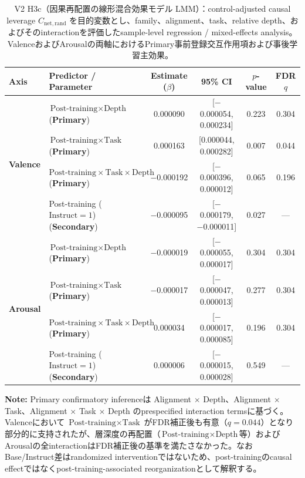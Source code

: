 \begin{table}[htbp]
\centering
\small
\caption{V2 H3c（因果再配置の線形混合効果モデル LMM）：control-adjusted causal leverage $C_{\mathrm{net,rand}}$ を目的変数とし、family、alignment、task、relative depth、およびそのinteractionを評価したsample-level regression / mixed-effects analysis。ValenceおよびArousalの両軸におけるPrimary事前登録交互作用項および事後学習主効果。}
\label{tab:v2_h3_causal_lmm}
\begin{tabular}{ll cccc}
\toprule
\textbf{Axis} & \textbf{Predictor / Parameter} & \textbf{Estimate ($\beta$)} & \textbf{95\% CI} & $p$-value & \textbf{FDR $q$} \\
\midrule
\multirow{4}{*}{\textbf{Valence}} & $\text{Post-training} \times \text{Depth}$ (\textbf{Primary}) & 0.000090       & [$-$0.000054, 0.000234]    & 0.223      & 0.304      \\
                                 & $\text{Post-training} \times \text{Task}$ (\textbf{Primary}) & 0.000163       & [0.000044, 0.000282]       & 0.007      & 0.044      \\
                                 & $\text{Post-training} \times \text{Task} \times \text{Depth}$ (\textbf{Primary}) & $-$0.000192    & [$-$0.000396, 0.000012]    & 0.065      & 0.196      \\
                                 & Post-training ($\text{Instruct} = 1$) (\textbf{Secondary})   & $-$0.000095    & [$-$0.000179, $-$0.000011] & 0.027      & ---        \\
\midrule
\multirow{4}{*}{\textbf{Arousal}} & $\text{Post-training} \times \text{Depth}$ (\textbf{Primary}) & $-$0.000019    & [$-$0.000055, 0.000017]    & 0.304      & 0.304      \\
                                 & $\text{Post-training} \times \text{Task}$ (\textbf{Primary}) & $-$0.000017    & [$-$0.000047, 0.000013]    & 0.277      & 0.304      \\
                                 & $\text{Post-training} \times \text{Task} \times \text{Depth}$ (\textbf{Primary}) & 0.000034       & [$-$0.000017, 0.000085]    & 0.196      & 0.304      \\
                                 & Post-training ($\text{Instruct} = 1$) (\textbf{Secondary})   & 0.000006       & [$-$0.000015, 0.000028]    & 0.549      & ---        \\
\bottomrule
\end{tabular}
\vspace{1ex}
\begin{minipage}{\linewidth}
\footnotesize
\textbf{Note:} Primary confirmatory inferenceは Alignment $\times$ Depth、Alignment $\times$ Task、Alignment $\times$ Task $\times$ Depth のprespecified interaction termsに基づく。Valenceにおいて $\text{Post-training} \times \text{Task}$ がFDR補正後も有意（$q = 0.044$）となり部分的に支持されたが、層深度の再配置（$\text{Post-training} \times \text{Depth}$等）およびArousalの全interactionはFDR補正後の基準を満たさなかった。なおBase/Instruct差はrandomized interventionではないため、post-trainingのcausal effectではなくpost-training-associated reorganizationとして解釈する。
\end{minipage}
\end{table}